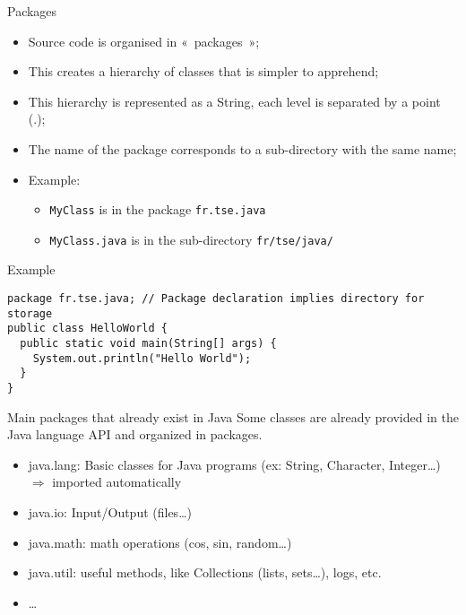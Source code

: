 \documentclass[English,c,%
hyperref={%
    pdftitle={FISA-DE2 OOP in Java},%
    pdfauthor={Muller, Gravier, Laforest, Subercaze},%
    pdfsubject={OOP in Java},%
    pdfkeywords={OOP, Java}%
    },%
xcolor={pdftex,svgnames} %
]{beamer}
\begin{document}
\begin{frame}{Packages}
\begin{itemize}
    \item Source code is organised in «~packages~»;
    \item This creates a hierarchy of classes that is simpler to apprehend;
    \item This hierarchy is represented as a String, each level is separated by a point (.);
    \item The name of the package corresponds to a sub-directory with the same name;
    \item Example: \\
    \begin{itemize}
      \item \texttt{MyClass} is in the package \texttt{fr.tse.java}
      \item \texttt{MyClass.java} is in the sub-directory \texttt{fr/tse/java/}
  \end{itemize}
\end{itemize}
\end{frame}

\begin{frame}[fragile]{Example}
\begin{lstlisting}[escapechar=\%,label=hellopackage,caption=HelloWorld.java.]
package fr.tse.java; // Package declaration implies directory for storage
public class HelloWorld {
  public static void main(String[] args) {
    System.out.println("Hello World");
  }
}
\end{lstlisting}
\end{frame}


\begin{frame}{Main packages that already exist in Java}
Some classes are already provided in the Java language API and organized in packages.
\begin{itemize}
  \item java.lang: Basic classes for Java programs (ex: String, Character, Integer\ldots{})
  $\Rightarrow$ imported automatically
  \item java.io: Input/Output (files\ldots{})
  \item java.math: math operations (cos, sin, random\ldots{})
  \item java.util: useful methods, like Collections (lists, sets\ldots{}), logs, etc.
  \item \ldots{}
\end{itemize}
\end{frame}
\end{document}
